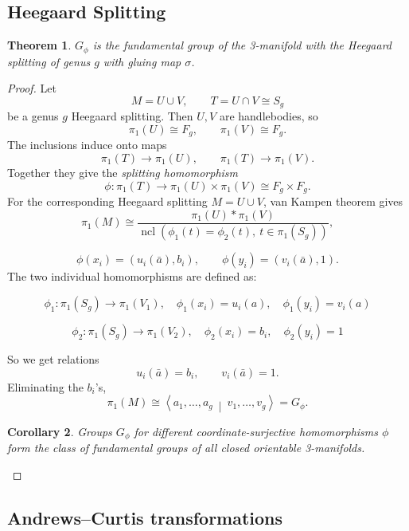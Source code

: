 \documentclass{article}
\newtheorem{theorem}{Theorem}[section]
\newtheorem{cy}[theorem]{Corollary}
\newcommand{\ncl}{\operatorname{ncl}}
\begin{document}
\subsection{Heegaard Splitting}
\begin{theorem}  $G_{\phi}$  is the fundamental group of the 3-manifold with the Heegaard splitting of genus $g$ with gluing map $\sigma$.
\end{theorem}
\begin{proof} Let
\[
   M=U\cup V,\qquad T=U\cap V\cong S_g
\]
be a genus \(g\) Heegaard splitting.
Then \(U,V\) are handlebodies, so
\[
   \pi_1(U)\cong F_g,\qquad \pi_1(V)\cong F_g.
\]
The inclusions induce onto maps
\[
\pi_1(T)\to \pi_1(U),\qquad \pi_1(T)\to \pi_1(V).
\]
Together they give the \emph{splitting homomorphism}
\[
   \phi:\pi_1(T)\longrightarrow \pi_1(U)\times \pi_1(V)\cong F_g\times F_g.
\]
For the corresponding Heegaard splitting \(M=U\cup V\), van Kampen theorem gives
\[
\pi_1(M)\cong
\frac{\pi_1(U)*\pi_1(V)}{\ncl(\phi_1(t)=\phi_2(t),\ t\in\pi_1(S_g))},
\]

\[
\phi(x_i)=(u_i(\bar a),b_i),
\qquad
\phi(y_i)=(v_i(\bar a),1).
\]
The two individual homomorphisms are defined as:

\begin{equation}
    \phi_1: \pi_1(S_g) \to \pi_1(V_1), \quad \phi_1(x_i) = u_i(a), \quad \phi_1(y_i) = v_i(a)
\end{equation}

\begin{equation}
    \phi_2: \pi_1(S_g) \to \pi_1(V_2), \quad \phi_2(x_i) = b_i, \quad \phi_2(y_i) = 1
\end{equation}


So we get relations
\[
  u_i(\bar a)=b_i,
  \qquad
  v_i(\bar a)=1.
\]
Eliminating the \(b_i\)'s,
\[
   \pi_1(M)\cong
   \left\langle a_1,\ldots,a_g\ \middle|\
        v_1,\ldots,v_g
   \right\rangle=G_\phi.
\]
 
\begin{cy} Groups $G_{\phi}$ for different coordinate-surjective homomorphisms $\phi$ form the class of fundamental groups of all closed orientable 3-manifolds.
\end{cy}


\end{proof}


\subsection{Andrews--Curtis transformations}
\end{document}
